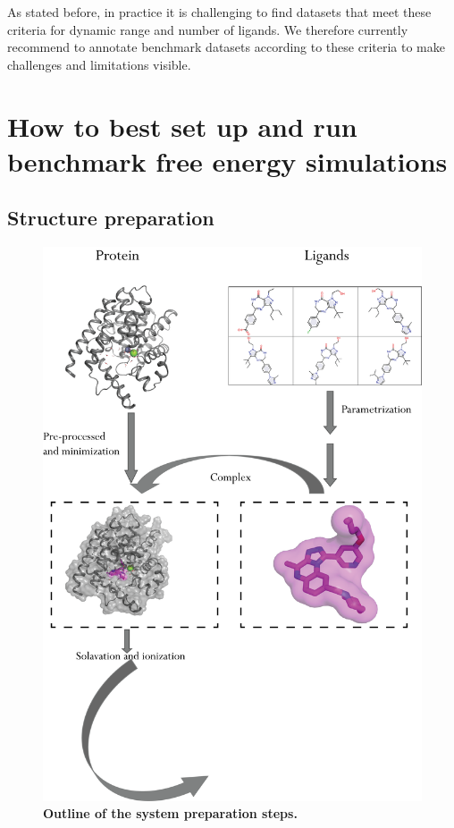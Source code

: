 \documentclass[9pt,bestpractices]{livecoms}
\begin{document}
As stated before, in practice it is challenging to find datasets that meet these criteria for dynamic range and number of ligands. We therefore currently recommend to annotate benchmark datasets according to these criteria to make challenges and limitations visible.

 
\section{How to best set up and run benchmark free energy simulations}

\subsection{Structure preparation}
\label{sec:prep}

\begin{figure}
    \centering
    \includegraphics[width=.6\textwidth]{system_preparation.png}
    \caption{\textbf{Outline of the system preparation steps.}}
    \label{fig:system_preparation}
\end{figure}
\end{document}
